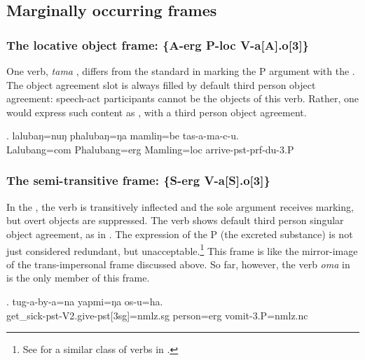 \subsection{Marginally occurring frames}\label{tr-marg}
\subsubsection[The locative object frame]{The locative object frame: \{A-{\sc erg} P-{\sc loc} V-a[A].o[3]\}}\label{tr-loc}


\noindent
One verb,  \emph{tama} , differs from the standard  in  marking the P argument with the  .  The object agreement slot is always filled by default third person object agreement: speech-act participants cannot be the objects of this verb. Rather, one would express  such content as , with a third person object agreement.

\exg. lalubaŋ=nuŋ   phalubaŋ=ŋa   mamliŋ=be   tas-a-ma-c-u.\\
Lalubang{\sc =com} Phalubang{\sc =erg} Mamling{\sc =loc} arrive{\sc -pst-prf-du-3.P}\\
 
  
 

\subsubsection[The semi-transitive frame]{The semi-transitive frame: \{S-{\sc erg} V-a[S].o[3]\}}\label{tr-semi}


\noindent
In the , the verb is transitively inflected and the sole argument receives  marking, but overt objects are suppres\-sed. The verb shows default third person singular object agreement, as in \Next. The expression of the P (the excreted substance) is not just considered redundant, but unacceptable.\footnote{See  \citet[1480]{Li2007Splitergativity} for a similar class of verbs in .} This frame is like the mirror-image of the trans-impersonal frame discussed above. So far, however, the verb \emph{oma}  in \Next is the only member of this frame.

\exg. tug-a-by-a=na yapmi=ŋa os-u=ha.\\
 get\_sick{\sc -pst-V2.give-pst[3sg]=nmlz.sg} person{\sc =erg} vomit{\sc -3.P=nmlz.nc}\\


